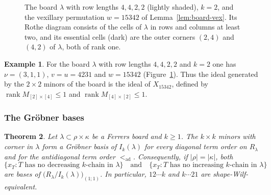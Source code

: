\documentclass[11pt]{amsart}
\newtheorem{theorem}{Theorem}[section]
\theoremstyle{definition}
\newtheorem{example}[theorem]{Example}
\theoremstyle{remark}
\newcommand{\ad}{\mathrm{ad}}
\newcommand{\gridlines}[2]{\draw[gray!55,very thin] (0,0) grid (#1,-#2);}
\newcommand{\shaderows}[2][gray!22]{\foreach \x/\y in {#2}{\fill[#1] (0,1-\x) rectangle (\y,-\x);}}
\newcommand{\shadecell}[3][gray!50]{\fill[#1] (#3-1,-#2) rectangle (#3,1-#2);}
\newcommand{\pt}[2]{\fill (#2-0.5,0.5-#1) circle (0.16);}
\newcommand{\rays}[3]{\draw[semithick] (#3,0.5-#1) -- (#2-0.5,0.5-#1) -- (#2-0.5,-#3);}
\begin{document}
\begin{figure}[ht]
\centering
{}
\caption{The board $\lambda$ with row lengths $4,4,2,2$ (lightly shaded), $k=2$, and the vexillary permutation $w=15342$ of Lemma~\ref{lem:board-vex}. Its Rothe diagram consists of the cells of $\lambda$ in rows and columns at least two, and its essential cells (dark) are the outer corners $(2,4)$ and $(4,2)$ of $\lambda$, both of rank one.}\label{fig:vex}
\end{figure}

\begin{example}
For the board $\lambda$ with row lengths $4,4,2,2$ and $k=2$ one has $\nu=(3,1,1)$, $v=u=4231$ and $w=15342$ (Figure~\ref{fig:vex}). Thus the ideal generated by the $2\times2$ minors of the board is the ideal of $X_{15342}$, defined by $\operatorname{rank}M_{[2]\times[4]}\le1$ and $\operatorname{rank}M_{[4]\times[2]}\le1$.
\end{example}

\subsubsection{The Gr\"obner bases}

\begin{theorem}\label{thm:ladder}
Let $\lambda\subset\rho\times\kappa$ be a Ferrers board and $k\ge1$. The $k\times k$ minors with corner in $\lambda$ form a Gr\"obner basis of $I_k(\lambda)$ for every diagonal term order on $R_\lambda$ and for the antidiagonal term order $<_\ad$. Consequently, if $|\rho|=|\kappa|$, both
\[
\{x_T : T\text{ has no decreasing $k$-chain in }\lambda\}\quad\text{and}\quad\{x_T : T\text{ has no increasing $k$-chain in }\lambda\}
\]
are bases of $\bigl(R_\lambda/I_k(\lambda)\bigr)_{(1;1)}$. In particular, $12\cdots k$ and $k\cdots21$ are shape-Wilf-equivalent.
\end{theorem}
\end{document}
